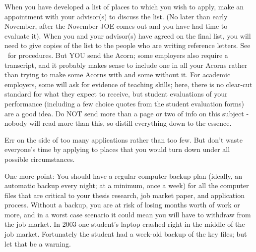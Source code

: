 \documentclass{econtex}
\begin{document}
When you have developed a list of places to which you wish to apply,
make an appointment with your advisor(s) to discuss the list.  (No
later than early November, after the November JOE comes out and you
have had time to evaluate it).  When you and your advisor(s) have
agreed on the final list, you will need to give copies of
the list to the people who are writing reference letters.  See \recLet~for procedures.  But YOU send the Acorn; some employers also require a
transcript, and it probably makes sense to include one in all your
Acorns rather than trying to make some Acorns with and some without
it.  For academic employers, some will ask for evidence of teaching
skills; here, there is no clear-cut standard for what they expect to
receive, but student evaluations of your performance (including a few
choice quotes from the student evaluation forms) are a good idea.  Do
NOT send more than a page or two of info on this subject - nobody will
read more than this, so distill everything down to the essence.

Err on the side of too many applications rather than too few.  But
don't waste everyone's time by applying to places that you would turn
down under all possible circumstances.
  
One more point: You should have a regular computer backup plan
(ideally, an automatic backup every night; at a minimum, once a week)
for all the computer files that are critical to your thesis research,
job market paper, and application process.  Without a backup, you are
at risk of losing months worth of work or more, and in a worst case
scenario it could mean you will have to withdraw from the job market.
In 2003 one student's laptop crashed right in the middle of the job
market.  Fortunately the student had a week-old backup of the key
files; but let that be a warning.

\pagebreak
\end{document}

